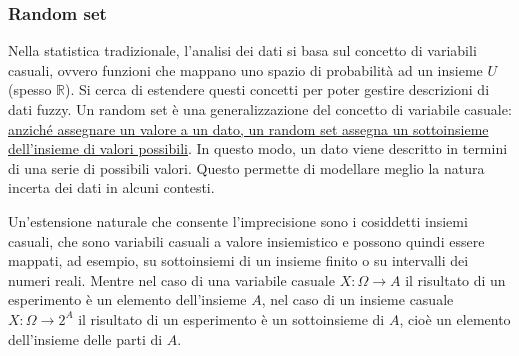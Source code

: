 \subsubsection{Random set}
Nella statistica tradizionale, l'analisi dei dati si basa sul concetto di variabili casuali, ovvero funzioni che mappano uno spazio di probabilità ad un insieme $U$ (spesso $\mathbb R$). Si cerca di estendere questi concetti per poter gestire descrizioni di dati fuzzy. Un random set è una generalizzazione del concetto di variabile casuale: \uline{anziché assegnare un valore a un dato, un random set assegna un sottoinsieme dell'insieme di valori possibili}. In questo modo, un dato viene descritto in termini di una serie di possibili valori. Questo permette di modellare meglio la natura incerta dei dati in alcuni contesti.

Un'estensione naturale che consente l'imprecisione sono i cosiddetti insiemi casuali, che sono variabili casuali a valore insiemistico e possono quindi essere mappati, ad esempio, su sottoinsiemi di un insieme finito o su intervalli dei numeri reali. Mentre nel caso di una variabile casuale $X: \Omega \rightarrow A$ il risultato di un esperimento è un elemento dell'insieme $A$, nel caso di un insieme casuale $X: \Omega \rightarrow 2^A$ il risultato di un esperimento è un sottoinsieme di $A$, cioè un elemento dell'insieme delle parti di $A$.

